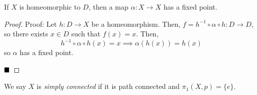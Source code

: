 \begin{lemma}
    If $X$ is homeomorphic to $D$, then a map $\alpha : X \to X$ has a fixed point.
\end{lemma}
\begin{proof}{Proof:}
    Let $h : D \to X$ be a homeomorphism. Then, $f = h^{-1} \circ \alpha \circ h : D \to D$, so there exists $x \in D$ such that $f(x) = x$. Then,
    \[ h^{-1} \circ \alpha \circ h(x) = x \implies \alpha(h(x)) = h(x) \]
    so $\alpha$ has a fixed point.

    $\qed$
\end{proof}

\begin{definition}
    We say $X$ is \emph{simply connected} if it is path connected and $\pi_1(X, p) = \{e\}$.
\end{definition}

